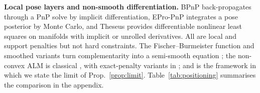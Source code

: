 \textbf{Local pose layers and non-smooth differentiation.} BPnP \cite{chen2020bpn} back-propagates through a PnP solve by implicit differentiation, EPro-PnP \cite{chen2022epropnp} integrates a pose posterior by Monte Carlo, and Theseus \cite{pineda2022theseus} provides differentiable nonlinear least squares on manifolds with implicit or unrolled derivatives. All are local and support penalties but not hard constraints. The Fischer--Burmeister function \cite{fischer1992} and smoothed variants \cite{kanzow1996} turn complementarity into a semi-smooth equation \cite{facchinei2003}; the non-convex ALM is classical \cite{bertsekas1982,rockafellar1998}, with exact-penalty variants in \cite{fletcher1987}; and \cite{bolte2021nonsmooth} is the framework in which we state the limit of Prop.~\ref{prop:limit}. Table~\ref{tab:positioning} summarises the comparison in the appendix.
